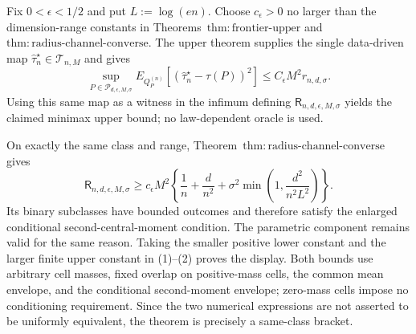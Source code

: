 Fix \(0<\epsilon<1/2\) and put \(L:=\log(en)\).  Choose \(c_\epsilon>0\) no larger than the dimension-range constants in Theorems~\(\mathrm{thm:frontier\text{-}upper}\) and \(\mathrm{thm:radius\text{-}channel\text{-}converse}\).  The upper theorem supplies the single data-driven map \(\widehat\tau_n^\star\in\mathcal T_{n,M}\) and gives
\[
 \sup_{P\in\mathcal P_{d,\epsilon,M,\sigma}}
 E_{Q_P^{(n)}}[(\widehat\tau_n^\star-\tau(P))^2]
 \le C_\epsilon M^2r_{n,d,\sigma}.
\tag{1}
\]
Using this same map as a witness in the infimum defining \(\mathsf R_{n,d,\epsilon,M,\sigma}\) yields the claimed minimax upper bound; no law-dependent oracle is used.

On exactly the same class and range, Theorem~\(\mathrm{thm:radius\text{-}channel\text{-}converse}\) gives
\[
 \mathsf R_{n,d,\epsilon,M,\sigma}
 \ge c_\epsilon M^2\left\{\frac1n+\frac d{n^2}
 +\sigma^2\min\left(1,\frac{d^2}{n^2L^2}\right)\right\}.
\tag{2}
\]
Its binary subclasses have bounded outcomes and therefore satisfy the enlarged conditional second-central-moment condition.  The parametric component remains valid for the same reason.  Taking the smaller positive lower constant and the larger finite upper constant in (1)--(2) proves the display.  Both bounds use arbitrary cell masses, fixed overlap on positive-mass cells, the common mean envelope, and the conditional second-moment envelope; zero-mass cells impose no conditioning requirement.  Since the two numerical expressions are not asserted to be uniformly equivalent, the theorem is precisely a same-class bracket.